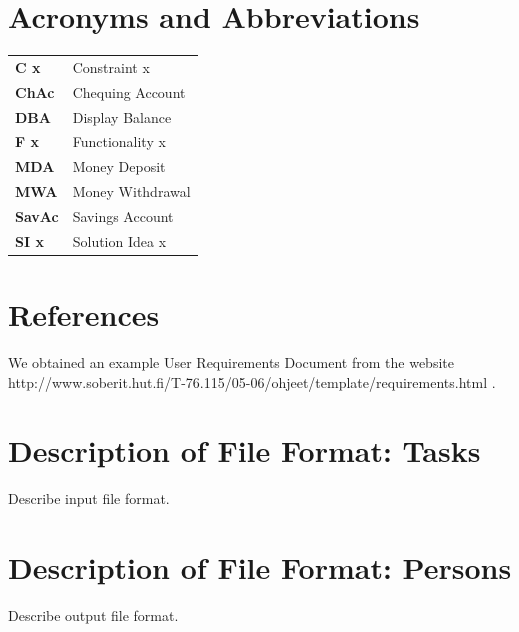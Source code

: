 \documentclass[12pt]{article}
\begin{document}
\section{Acronyms and Abbreviations}
\begin{table}[H]
  \begin{tabular}{l l}
    \bf{C} x & Constraint x\\
    \bf{ChAc} & Chequing Account\\
    \bf{DBA} & Display Balance\\
    \bf{F} x & Functionality x\\
    \bf{MDA} & Money Deposit\\
    \bf{MWA} & Money Withdrawal\\
    \bf{SavAc} & Savings Account\\
    \bf{SI} x & Solution Idea x\\
  \end{tabular}
\end{table}

\section{References}
We obtained an example User Requirements Document from the website http://www.soberit.hut.fi/T-76.115/05-06/ohjeet/template/requirements.html .

\appendix

\section{Description of File Format: Tasks}

Describe input file format.

\section{Description of File Format: Persons}

Describe output file format.
\end{document}
